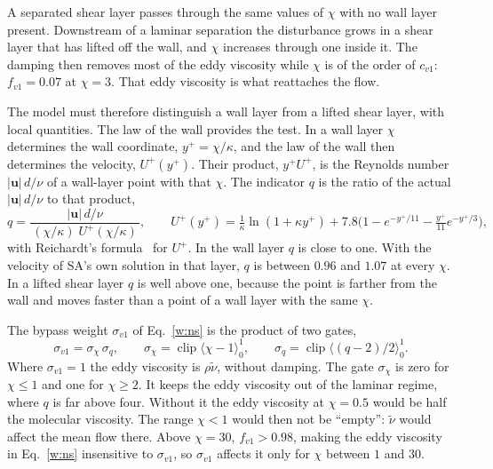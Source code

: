 \documentclass[conf]{new-aiaa}
\begin{document}
A separated shear layer passes through the same values of $\chi$ with no wall
layer present. Downstream of a laminar separation the disturbance grows in a
shear layer that has lifted off the wall, and $\chi$ increases through one
inside it. The damping then removes most of the eddy viscosity while $\chi$ is
of the order of $c_{v1}$: $f_{v1}=0.07$ at $\chi=3$. That eddy viscosity is
what reattaches the flow.

The model must therefore distinguish a wall layer from a lifted
shear layer, with local quantities. The law of the wall provides the test. In
a wall layer $\chi$ determines the wall coordinate,
$y^+=\chi/\kappa$, and the law of the wall then determines the velocity,
$U^+(y^+)$. Their product, $y^+U^+$, is the Reynolds number $|\mathbf u|\,d/\nu$ of a
wall-layer point with that $\chi$. The indicator $q$ is the ratio of the
actual $|\mathbf u|\,d/\nu$ to that product,
\begin{equation}
  q = \frac{|\mathbf u|\,d/\nu}{\,(\chi/\kappa)\;U^+(\chi/\kappa)\,},
  \qquad
  U^+(y^+)=\tfrac1\kappa\ln(1+\kappa y^+)
  +7.8\big(1-e^{-y^+/11}-\tfrac{y^+}{11}e^{-y^+/3}\big),
  \label{w:fv1q}
\end{equation}
with Reichardt's formula~\cite{reichardt_1951} for $U^+$. In the wall layer
$q$ is close to one. With the velocity of SA's own solution in that layer,
$q$ is between $0.96$ and $1.07$ at every $\chi$. In a lifted shear layer $q$ is well above one, because the point
is farther from the wall and moves faster than a point of a wall layer with
the same $\chi$.

The bypass weight $\sigma_{v1}$ of Eq.~\eqref{w:ns} is the product of two
gates,
\begin{equation}
  \sigma_{v1} = \sigma_\chi\,\sigma_q, \qquad
  \sigma_\chi=\operatorname{clip}\!\big\langle\chi-1\big\rangle_0^1, \qquad
  \sigma_q=\operatorname{clip}\!\big\langle(q-2)/2\big\rangle_0^1 .
  \label{w:fv1bypass}
\end{equation}
Where $\sigma_{v1}=1$ the eddy viscosity is $\rho\tilde\nu$, without damping.
The gate $\sigma_\chi$ is zero for $\chi\le1$ and one for $\chi\ge2$. It keeps
the eddy viscosity out of the laminar regime, where $q$ is far above four.
Without it the eddy viscosity at $\chi=0.5$ would be half the molecular
viscosity. The range $\chi<1$ would then not be ``empty'': $\tilde\nu$ would
affect the mean flow there. Above $\chi=30$, $f_{v1}>0.98$, making the eddy viscosity in
Eq.~\eqref{w:ns} insensitive to $\sigma_{v1}$, so $\sigma_{v1}$ affects it only for $\chi$ between $1$ and
$30$.
\end{document}

